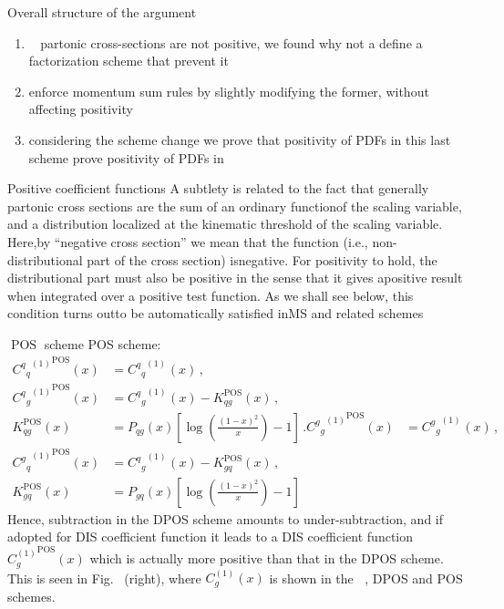 \documentclass[9pt]{beamer}
\DeclareMathOperator{\msbar}{\overline{MS}}
\DeclareMathOperator{\pos}{POS}
\begin{document}
\appendix

\begin{frame}{Overall structure of the argument}
    \begin{enumerate}
        \item $\msbar$ partonic cross-sections are not positive, we found why
            not a define a factorization scheme that prevent it
        \item enforce momentum sum rules by slightly modifying the former,
            without affecting positivity
        \item considering the scheme change we prove that positivity of PDFs in
            this last scheme prove positivity of PDFs in $\msbar$
    \end{enumerate}
\end{frame}

\begin{frame}{Positive coefficient functions}
    A subtlety is related to the fact that generally partonic cross sections
    are the sum of an ordinary functionof the scaling variable, and a
    distribution localized at the kinematic threshold of the scaling variable.
    Here,by “negative cross section” we mean that the function (i.e.,
    non-distributional part of the cross section) isnegative.  For positivity
    to hold,  the distributional part must also be positive in the sense that
    it gives apositive result when integrated over a positive test function.
    As we shall see below, this condition turns outto be automatically
    satisfied inMS and related schemes
\end{frame}

\begin{frame}{$\pos$ scheme}
POS scheme:
\begin{align*}
 {{C^q{}_q}^{(1)}}^{\pos}(x) &=  {{C^q{}_q}^{(1)}}^{\msbar}(x) \,, \\
 {{C^q{}_g}^{(1)}}^{\pos} (x) &=  {{C^q{}_g}^{(1)}}^{\msbar} (x) - K_{qg}^{\pos} (x) \,,\\
  K_{qg}^{\pos} (x) &=  P_{qg}(x)\left[\log(\frac{(1-x)^2}{x}) - 1\right] \,.
 {{C^g{}_g}^{(1)}}^{\pos}(x)  &=  {{C^g{}_g}^{(1)}}^{\msbar}(x) \,, \\
 {{C^g{}_q}^{(1)}}^{\pos} (x) &=  {{C^q{}_g}^{(1)}}^{\msbar} (x) - K_{gq}^{\pos} (x) \,,\\
  K_{gq}^{\pos} (x) &=  P_{gq}(x)\left[\log(\frac{(1-x)^2}{x})- 1\right]
\end{align*}
Hence, subtraction in the
DPOS scheme amounts to under-subtraction, and if adopted for DIS
coefficient function it leads to a DIS coefficient function
${C^{(1)}_{g}}^{\pos}(x)$ which is actually more positive than that
in the DPOS scheme. This is seen in Fig.~ (right), where
${C^{(1)}_{g}}(x)$ is shown in the $\msbar$, DPOS and POS schemes.
\end{frame}
\end{document}
